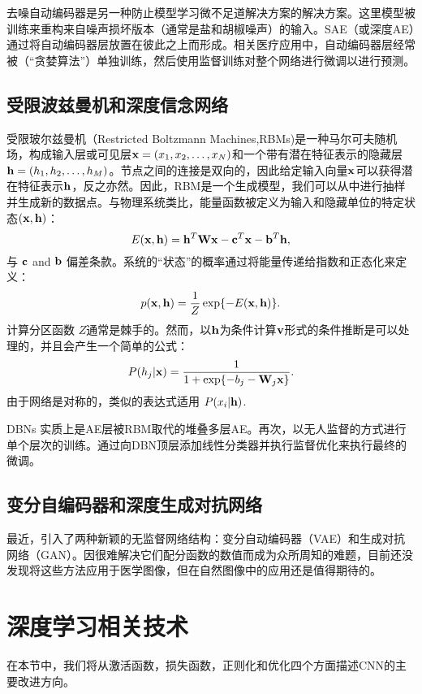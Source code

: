 去噪自动编码器\citep{Vincent2010Stacked}是另一种防止模型学习微不足道解决方案的解决方案。这里模型被训练来重构来自噪声损坏版本（通常是盐和胡椒噪声）的输入。SAE（或深度AE）通过将自动编码器层放置在彼此之上而形成。相关医疗应用中，自动编码器层经常被（“贪婪算法”）单独训练，然后使用监督训练对整个网络进行微调以进行预测。

\subsection{受限波兹曼机和深度信念网络}
受限玻尔兹曼机（Restricted Boltzmann Machines,RBMs)\citep{Hinton2006a}是一种马尔可夫随机场，构成输入层或可见层${\bf x} = (x_{1}, x_{2}, \ldots, x_{N})$和一个带有潜在特征表示的隐藏层${\bf h} = (h_{1}, h_{2}, \ldots, h_{M})$。节点之间的连接是双向的，因此给定输入向量$\bf x$可以获得潜在特征表示$\bf h$，反之亦然。因此，RBM是一个生成模型，我们可以从中进行抽样并生成新的数据点。与物理系统类比，能量函数被定义为输入和隐藏单位的特定状态$({\bf x}, {\bf h})$：
\begin{equation}
 E({\bf x}, {\bf h}) = {\bf h}^{T}{\bf W}{\bf x} - {\bf c}^{T}{\bf x} - {\bf b}^{T}{\bf h},
\end{equation}
与 ${\bf c}$ and ${\bf b}$ 偏差条款。系统的“状态”的概率通过将能量传递给指数和正态化来定义：
\begin{equation}
 p({\bf x}, {\bf h}) = \frac{1}{Z} \exp\{ - E({\bf x}, {\bf h}) \}.
\end{equation}
计算分区函数 $Z$通常是棘手的。然而，以${\bf h}$为条件计算${\bf v}$形式的条件推断是可以处理的，并且会产生一个简单的公式：
\begin{equation}
 P(h_{j} | {\bf x}) = \frac{1}{ 1 + \exp\{ -b_{j} - {\bf W}_{j}{\bf x}\} }.
\end{equation}
由于网络是对称的，类似的表达式适用 $P(x_{i} | {\bf h})$.

DBNs \citep{Hinton2009Deep}实质上是AE层被RBM取代的堆叠多层AE。再次，以无人监督的方式进行单个层次的训练。通过向DBN顶层添加线性分类器并执行监督优化来执行最终的微调。
\subsection{变分自编码器和深度生成对抗网络}
最近，引入了两种新颖的无监督网络结构：变分自动编码器（VAE）\citep{Kingma2013Auto}和生成对抗网络（GAN）\citep{Goodfellow2014Generative}。因很难解决它们配分函数的数值而成为众所周知的难题，目前还没发现将这些方法应用于医学图像，但在自然图像中的应用还是值得期待的。

\section{深度学习相关技术}
在本节中，我们将从激活函数，损失函数，正则化和优化四个方面描述CNN的主要改进方向。
